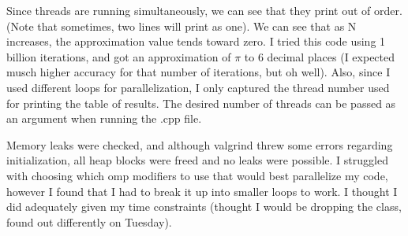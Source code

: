 \documentclass[12pt]{article}
\begin{document}
Since threads are running simultaneously, we can see that they print out of order. (Note that sometimes, two lines will print as one). We can see that as N increases, the approximation value tends toward zero. I tried this code using 1 billion iterations, and got an approximation of $\pi$ to 6 decimal places (I expected musch higher accuracy for that number of iterations, but oh well). Also, since I used different loops for parallelization, I only captured the thread number used for printing the table of results. The desired number of threads can be passed as an argument when running the .cpp file.

Memory leaks were checked, and although valgrind threw some errors regarding initialization, all heap blocks were freed and no leaks were possible. I struggled with choosing which omp modifiers to use that would best parallelize my code, however I found that I had to break it up into smaller loops to work. I thought I did adequately given my time constraints (thought I would be dropping the class, found out differently on Tuesday).
\end{document}
